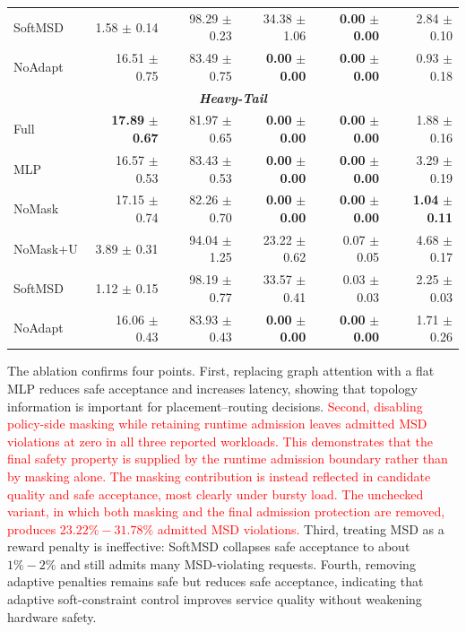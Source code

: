 \documentclass[final,5p]{elsarticle}
\newcommand{\rev}[1]{\textcolor{red}{#1}}
\begin{document}
\begin{table}[t]
{\begin{tabular}{lrrrrr}
SoftMSD & 1.58 $\pm$ 0.14 & 98.29 $\pm$ 0.23 & 34.38 $\pm$ 1.06 & \textbf{0.00} $\pm$ \textbf{0.00} & 2.84 $\pm$ 0.10 \\
NoAdapt & 16.51 $\pm$ 0.75 & 83.49 $\pm$ 0.75 & \textbf{0.00} $\pm$ \textbf{0.00} & \textbf{0.00} $\pm$ \textbf{0.00} & 0.93 $\pm$ 0.18 \\
\midrule
\multicolumn{6}{c}{\textbf{\textit{Heavy-Tail}}} \\
\midrule
Full & \textbf{17.89} $\pm$ \textbf{0.67} & 81.97 $\pm$ 0.65 & \textbf{0.00} $\pm$ \textbf{0.00} & \textbf{0.00} $\pm$ \textbf{0.00} & 1.88 $\pm$ 0.16 \\
MLP & 16.57 $\pm$ 0.53 & 83.43 $\pm$ 0.53 & \textbf{0.00} $\pm$ \textbf{0.00} & \textbf{0.00} $\pm$ \textbf{0.00} & 3.29 $\pm$ 0.19 \\
NoMask & 17.15 $\pm$ 0.74 & 82.26 $\pm$ 0.70 & \textbf{0.00} $\pm$ \textbf{0.00} & \textbf{0.00} $\pm$ \textbf{0.00} & \textbf{1.04} $\pm$ \textbf{0.11} \\
NoMask+U & 3.89 $\pm$ 0.31 & 94.04 $\pm$ 1.25 & 23.22 $\pm$ 0.62 & 0.07 $\pm$ 0.05 & 4.68 $\pm$ 0.17 \\
SoftMSD & 1.12 $\pm$ 0.15 & 98.19 $\pm$ 0.77 & 33.57 $\pm$ 0.41 & 0.03 $\pm$ 0.03 & 2.25 $\pm$ 0.03 \\
NoAdapt & 16.06 $\pm$ 0.43 & 83.93 $\pm$ 0.43 & \textbf{0.00} $\pm$ \textbf{0.00} & \textbf{0.00} $\pm$ \textbf{0.00} & 1.71 $\pm$ 0.26 \\
\bottomrule
\end{tabular}
}
\end{table}


The ablation confirms four points. First, replacing graph attention with a flat MLP reduces safe acceptance and increases latency, showing that topology information is important for placement--routing decisions. \rev{Second, disabling policy-side masking while retaining runtime admission leaves admitted MSD violations at zero in all three reported workloads. This demonstrates that the final safety property is supplied by the runtime admission boundary rather than by masking alone. The masking contribution is instead reflected in candidate quality and safe acceptance, most clearly under bursty load. The unchecked variant, in which both masking and the final admission protection are removed, produces \(23.22\%{-}31.78\%\) admitted MSD violations.} Third, treating MSD as a reward penalty is ineffective: SoftMSD collapses safe acceptance to about \(1\%{-}2\%\) and still admits many MSD-violating requests. Fourth, removing adaptive penalties remains safe but reduces safe acceptance, indicating that adaptive soft-constraint control improves service quality without weakening hardware safety.
\end{document}
